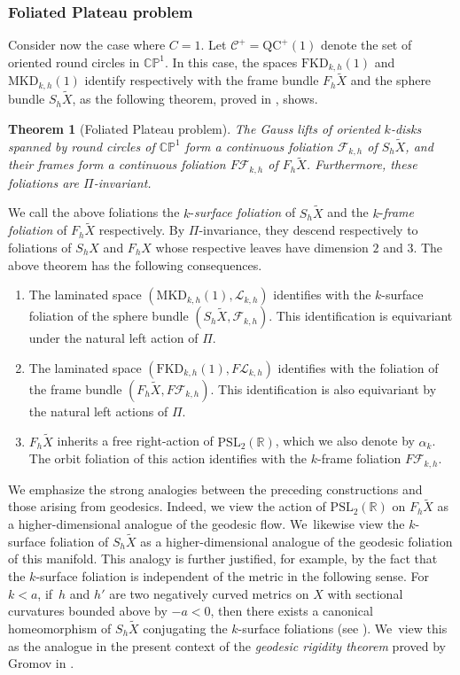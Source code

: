 \documentclass[JEP,XML,SOM,Unicode,NoEqCountersInSection,published]{cedram}
\newcommand{\ksurface}{$k$\nobreakdash-surface\xspace}
\newcommand{\kdisks}{$k$\nobreakdash-disks\xspace}
\theoremstyle{plain}
\newtheorem{theorem}{Theorem}[section]
\theoremstyle{definition}
\newcommand\PSL{\mathrm{PSL}_2(\mathbb{R})}
\newcommand\CP{\C\PP^1}
\newcommand{\C}{{\mathbb C}}
\newcommand{\PP}{{\mathbb P}}
\newcommand{\cC}{{\mathcal C}}
\newcommand{\cF}{{\mathcal F}}
\newcommand{\cL}{{\mathcal L}}
\newcommand{\QC}{\mathrm{QC}}
\newcommand{\MKD}{\mathrm{MKD}}
\newcommand{\FKD}{\mathrm{FKD}}
\begin{document}
\subsubsection{Foliated Plateau problem}\label{sss.FPP} Consider now the case where $C=1$. Let $\cC^+=\QC^+(1)$ denote the set of oriented round circles in $\CP$. In this case, the spaces $\FKD_{k,h}(1)$ and $\MKD_{k,h}(1)$ identify respectively with the frame bundle $F_h\tilde{X}$ and the sphere bundle $S_h\tilde{X}$, as the following theorem, proved in \cite[Th.\,2.1.3]{ALS}, shows.

\begin{theorem}[Foliated Plateau problem]\label{th_foliated_Plateau} The Gauss lifts of oriented \kdisks spanned by round circles of $\CP$ form a continuous foliation $\cF_{k,h}$ of $S_h\tilde{X}$, and their frames form a continuous foliation $F\cF_{k,h}$ of $F_h\tilde{X}$. Furthermore, these foliations are $\Pi$-invariant.
\end{theorem}

We call the above foliations the $k$-\emph{surface foliation} of $S_h\tilde{X}$ and the $k$-\emph{frame foliation} of $F_h\tilde{X}$ respectively. By $\Pi$-invariance, they descend respectively to foliations of $S_h X$ and $F_h X$ whose respective leaves have dimension $2$ and $3$. The above theorem has the following consequences.

\begin{enumerate}
\item The laminated space $(\MKD_{k,h}(1),\cL_{k,h})$ identifies with the \ksurface foliation of the sphere bundle $(S_h\tilde{X},\cF_{k,h})$. This identification is equivariant under the natural left action of $\Pi$.
\item The laminated space $(\FKD_{k,h}(1),F\cL_{k,h})$ identifies with the foliation of the frame bundle $(F_h\tilde{X},F\cF_{k,h})$. This identification is also equivariant by the natural left actions of $\Pi$.
\item $F_h\tilde{X}$ inherits a free right-action of $\PSL$, which we also denote by $\alpha_k$. The orbit foliation of this action identifies with the $k$-frame foliation $F\cF_{k,h}$.
\end{enumerate}

We emphasize the strong analogies between the preceding constructions and those arising from geodesics. Indeed, we view the action of $\PSL$ on $F_h\tilde X$ as a higher-dimensional analogue of the geodesic flow. We~likewise view the \ksurface foliation of $S_h\tilde{X}$ as a higher-dimensional analogue of the geodesic foliation of this manifold. This analogy is further justified, for example, by the fact that the \ksurface foliation is independent of the metric in the following sense. For $k<a$, if~$h$ and $h'$ are two negatively curved metrics on $X$ with sectional curvatures bounded above by \hbox{$-a<0$}, then there exists a canonical homeomorphism of $S_h\tilde{X}$ conjugating the \ksurface foliations (see \cite[Th.\,2.1.5.]{ALS}). We~view this as the analogue in the present context of the \emph{geodesic rigidity theorem} proved by Gromov in \cite{Gromov3}.
\end{document}
